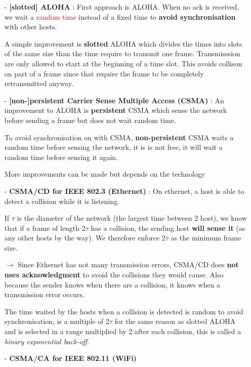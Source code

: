 \begin{itemize}
    \item[-] \textbf{[slotted] ALOHA} : First approach is ALOHA.
        When no ack is received, we wait a \textcolor{red}{random time} instead of a fixed time to \textbf{avoid synchronisation} with other hosts.

A simple improvement is \textbf{slotted} ALOHA which divides the times into slots of the same size than the time require to transmit one frame.
Transmisssion are only allowed to start at the beginning of a time slot.
This avoids collison on part of a frame since that require the frame to be completely retransmitted anyway.

\item[-] \textbf{[non-]persistent Carrier Sense Multiple Access (CSMA)} :
An improvement to ALOHA is \textbf{persistent} CSMA which sense the network before sending a frame but does not wait random time.

To avoid synchronisation on with CSMA, \textbf{non-persistent} CSMA waits a random time before sensing the network, it is is not free, it will wait a random time before sensing it again.

\item [More] improvements can be made but depends on the technology

\item[-] \textbf{CSMA/CD for IEEE 802.3 (Ethernet)} :
On ethernet, a host is able to detect a collision while it is listening.

If $\tau$ is the diameter of the network (the largest time between 2 host),
we know that if a frame of length $2\tau$ has a collision, the sending host \textbf{will sense it} (as any 
other hosts by the way).
We therefore enforce $2\tau$ as the minimum frame size.

$\to$ Since Ethernet has not many transmission errors, CSMA/CD does \textbf{not uses acknowledgment} to 
avoid the collisions they would cause. Also because the sender knows when there are a collision, it knows 
when a transmission error occurs.

The time waited by the hosts when a collision is detected is random to avoid synchronisation,
is a multiple of $2\tau$ for the same reason as slotted ALOHA and is selected in a range multiplied by 2 after each collision,
this is called a \emph{binary exponential back-off}.

\item[-] \textbf{CSMA/CA for IEEE 802.11 (WiFi)}


\end{itemize}
